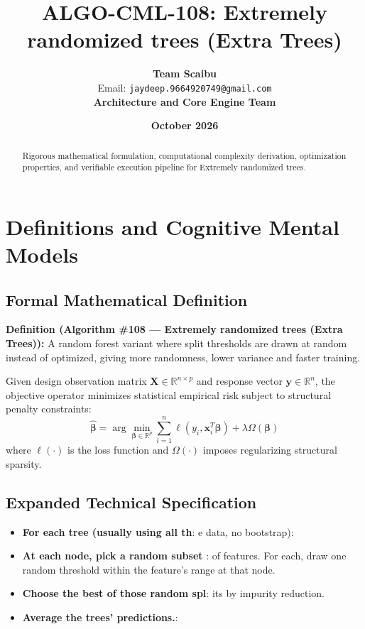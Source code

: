 \documentclass[11pt,a4paper]{article}
\title{\textbf{ALGO-CML-108: Extremely randomized trees (Extra Trees)}}
\author{\textbf{Team Scaibu} \\ \small Email: \texttt{jaydeep.9664920749@gmail.com} \\ \small \textbf{Architecture and Core Engine Team}}
\date{\textbf{October 2026}}
\theoremstyle{definition}
\begin{document}
\maketitle

\begin{abstract}
Rigorous mathematical formulation, computational complexity derivation, optimization properties, and verifiable execution pipeline for Extremely randomized trees.
\end{abstract}

\section{Definitions and Cognitive Mental Models}

\subsection{Formal Mathematical Definition}
\textbf{Definition (Algorithm \#108 --- Extremely randomized trees (Extra Trees)):}
A random forest variant where split thresholds are drawn at random instead of optimized, giving more randomness, lower variance and faster training.

Given design observation matrix $\mathbf{X} \in \mathbb{R}^{n \times p}$ and response vector $\mathbf{y} \in \mathbb{R}^n$, the objective operator minimizes statistical empirical risk subject to structural penalty constraints:
\begin{equation}
\hat{\boldsymbol{\beta}} = \arg\min_{\boldsymbol{\beta} \in \mathbb{R}^p} \sum_{i=1}^n \ell(y_i, \mathbf{x}_i^T \boldsymbol{\beta}) + \lambda \Omega(\boldsymbol{\beta})
\end{equation}
where $\ell(\cdot)$ is the loss function and $\Omega(\cdot)$ imposes regularizing structural sparsity.

\subsection{Expanded Technical Specification}
\begin{itemize}
\item \textbf{For each tree (usually using all th}: e data, no bootstrap):
\item \textbf{At each node, pick a random subset }: of features. For each, draw one random threshold within the feature's range at that node.
\item \textbf{Choose the best of those random spl}: its by impurity reduction.
\item \textbf{Average the trees' predictions.}: 
\end{itemize}
\end{document}
